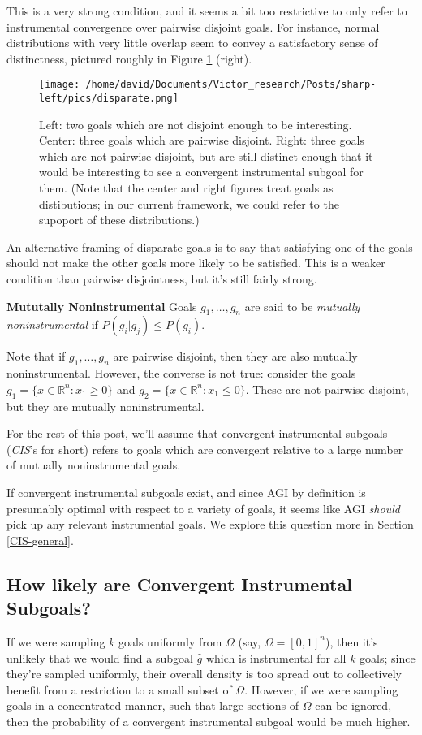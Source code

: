 \documentclass{article}
\begin{document}
This is a very strong condition, and it seems a bit too restrictive to only refer to instrumental convergence over pairwise disjoint goals. For instance, normal distributions with very little overlap seem to convey a satisfactory sense of distinctness, pictured roughly in Figure \ref{fig:disparate} (right).

\begin{figure}[ht]
    \centering
    \texttt{[image: /home/david/Documents/Victor\_research/Posts/sharp-left/pics/disparate.png]} 
    \caption{Left: two goals which are not disjoint enough to be interesting. Center: three goals which are pairwise disjoint. Right: three goals which are not pairwise disjoint, but are still distinct enough that it would be interesting to see a convergent instrumental subgoal for them. (Note that the center and right figures treat goals as distibutions; in our current framework, we could refer to the supoport of these distributions.)}
    \label{fig:disparate} 
\end{figure}

An alternative framing of disparate goals is to say that satisfying one of the goals should not make the other goals more likely to be satisfied. This is a weaker condition than pairwise disjointness, but it's still fairly strong.

\begin{definition}{\textbf{Mututally Noninstrumental}}
    Goals $g_1, \dots, g_n$ are said to be \emph{mutually noninstrumental} if $P(g_i|g_j)\le P(g_i)$.
\end{definition}

Note that if $g_1, \dots, g_n$ are pairwise disjoint, then they are also mutually noninstrumental. However, the converse is not true: consider the goals $g_1=\{x\in\mathbb{R}^n: x_1\ge 0\}$ and $g_2=\{x\in\mathbb{R}^n: x_1\le 0\}$. These are not pairwise disjoint, but they are mutually noninstrumental.

For the rest of this post, we'll assume that convergent instrumental subgoals (\emph{CIS}'s for short) refers to goals which are convergent relative to a large number of mutually noninstrumental goals. 

If convergent instrumental subgoals exist, and since AGI by definition is presumably optimal with respect to a variety of goals, it seems like AGI \emph{should} pick up any relevant instrumental goals. We explore this question more in Section \ref{CIS-general}.

\subsection{How likely are Convergent Instrumental Subgoals?}
If we were sampling $k$ goals uniformly from $\Omega$ (say, $\Omega=[0,1]^n$), then it's unlikely that we would find a subgoal $\hat{g}$ which is instrumental for all $k$ goals; since they're sampled uniformly, their overall density is too spread out to collectively benefit from a  restriction to a small subset of $\Omega$. However, if we were sampling goals in a concentrated manner, such that large sections of $\Omega$ can be ignored, then the probability of a convergent instrumental subgoal would be much higher.
\end{document}
